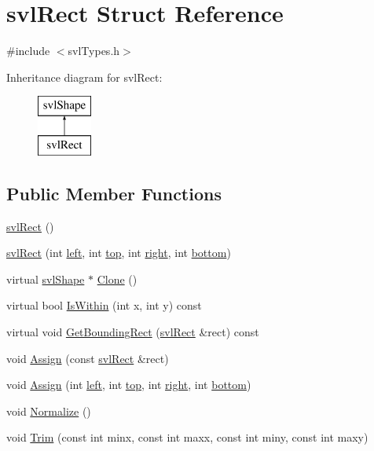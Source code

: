 \hypertarget{structsvl_rect}{\section{svl\-Rect Struct Reference}
\label{structsvl_rect}
}


{\ttfamily \#include $<$svl\-Types.\-h$>$}

Inheritance diagram for svl\-Rect\-:\begin{figure}[H]
\begin{center}
\leavevmode
\includegraphics[height=2.000000cm]{dd/d02/structsvl_rect}
\end{center}
\end{figure}
\subsection*{Public Member Functions}
\begin{DoxyCompactItemize}
\item 
\hyperlink{structsvl_rect_a4b5e30c09763e483582b5eef11459728}{svl\-Rect} ()
\item 
\hyperlink{structsvl_rect_a6cbc7247eb1283ef4c48a40f9f12bdce}{svl\-Rect} (int \hyperlink{structsvl_rect_aee6c8420a1d44587061ddc2301ce7126}{left}, int \hyperlink{structsvl_rect_a66ceb775b0be45ce2d4229208e1bb210}{top}, int \hyperlink{structsvl_rect_a277323d99bd51d332973e9f4c94ef081}{right}, int \hyperlink{structsvl_rect_abebdb3b96af5a98d7a952b6a441f7e89}{bottom})
\item 
virtual \hyperlink{structsvl_shape}{svl\-Shape} $\ast$ \hyperlink{structsvl_rect_a0ab014564b0a89c3ca7827fabe4a3456}{Clone} ()
\item 
virtual bool \hyperlink{structsvl_rect_a902cdd64176ef3b0f8b9bf6ec765eb8b}{Is\-Within} (int x, int y) const 
\item 
virtual void \hyperlink{structsvl_rect_a67c503e5c9786eaa5db09d036b50081d}{Get\-Bounding\-Rect} (\hyperlink{structsvl_rect}{svl\-Rect} \&rect) const 
\item 
void \hyperlink{structsvl_rect_a82eb80ea151de2e80a0bc05edb86e6e0}{Assign} (const \hyperlink{structsvl_rect}{svl\-Rect} \&rect)
\item 
void \hyperlink{structsvl_rect_a117afb790f25ab7ac6736267d8e3fc29}{Assign} (int \hyperlink{structsvl_rect_aee6c8420a1d44587061ddc2301ce7126}{left}, int \hyperlink{structsvl_rect_a66ceb775b0be45ce2d4229208e1bb210}{top}, int \hyperlink{structsvl_rect_a277323d99bd51d332973e9f4c94ef081}{right}, int \hyperlink{structsvl_rect_abebdb3b96af5a98d7a952b6a441f7e89}{bottom})
\item 
void \hyperlink{structsvl_rect_a210eeef09846b33ede5425949ebb4b0c}{Normalize} ()
\item 
void \hyperlink{structsvl_rect_a31eda9994c2a4d0f008228556424d12c}{Trim} (const int minx, const int maxx, const int miny, const int maxy)
\end{DoxyCompactItemize}
